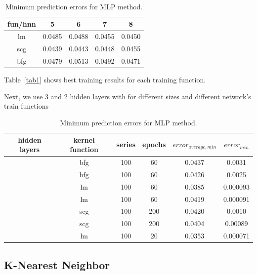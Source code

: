 \documentclass[
10pt, %
a4paper, %
oneside, %
headinclude,footinclude, %
BCOR5mm, %
]{scrartcl}
\begin{document}

\begin{table}[H]
	\centering
	\begin{tabular}{ | c | c | c | c | c | }
    \hline
     fun/hnn & 5 & 6 & 7 & 8 \\ \hline
    lm & 0.0485 & 0.0488 & 0.0455 & \cellcolor{gray(x11gray)!25}0.0450 \\ \hline
    scg & \cellcolor{amber!25}0.0439 & 0.0443 & 0.0448 & 0.0455 \\ \hline
    bfg & 0.0479 & 0.0513 & 0.0492 & \cellcolor{antiquebrass!25}0.0471 \\ \hline
  	\end{tabular}
  	\caption{Minimum prediction errors for MLP method.}
  	\label{tab1}
\end{table}

Table~\vref{tab1} shows best training results for each training function. %

Next, we use 3 and 2 hidden layers with for different sizes and different network's train functions

\begin{table}[H]
	\centering
	\begin{tabular}{ | c | c | c | c | c | c | }
    \hline
    hidden layers & kernel function & series & epochs & $ error_{average,min} $ & $ error_{min} $ \\ \hline
    [8,6,6] & bfg & 100 & 60 & 0.0437 & 0.0031 \\ \hline
    [10,8,6] & bfg & 100 & 60 & 0.0426 & 0.0025 \\ \hline
    [10,8,6] & lm & 100 & 60 & 0.0385 & 0.000093 \\ \hline
    [8,7,6] & lm & 100 & 60 & 0.0419 & \cellcolor{amber!25}0.000091 \\ \hline
    [10,8,6] & scg & 100 & 200 & 0.0420 & 0.0010 \\ \hline
    [8,7,6] & scg & 100 & 200 & 0.0404 & 0.00089 \\ \hline
    [9,7] & lm & 100 & 20 & \cellcolor{amber!25}0.0353 & 0.000071 \\ \hline
  	\end{tabular}
  	\caption{Minimum prediction errors for MLP method.}
  	\label{tab1}
\end{table}

\subsection{K-Nearest Neighbor}
\end{document}
